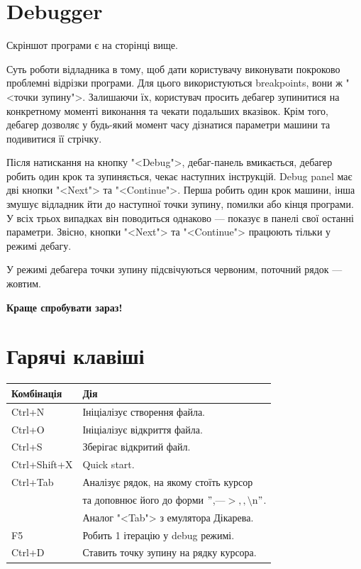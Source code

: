 \documentclass[oneside,final,14pt]{extreport}
\begin{document}
\pagebreak
{}
\setcounter{page}{14}
\section{Debugger}
Скріншот програми є на сторінці вище.
\medskip

Суть роботи відладника в тому, щоб дати користувачу виконувати покроково проблемні відрізки програми. Для цього використуються breakpoints, вони ж "<точки зупину">. Залишаючи їх, користувач просить дебагер зупинитися на конкретному моменті виконання та чекати подальших вказівок. Крім того, дебагер дозволяє у будь-який момент часу дізнатися параметри машини та подивитися її стрічку.

Після натискання на кнопку "<Debug">, дебаг-панель вмикається, дебагер робить один крок та зупиняється, чекає наступних інструкцій. Debug panel має дві кнопки "<Next"> та "<Continue">. Перша робить один крок машини, інша змушує відладник йти до наступної точки зупину, помилки або кінця програми. У всіх трьох випадках він поводиться однаково --- показує в панелі свої останні параметри.
Звісно, кнопки "<Next"> та "<Continue"> працюють тільки у режимі дебагу.

У режимі дебагера точки зупину підсвічуються червоним, поточний рядок --- жовтим.

{\bf Краще спробувати зараз!}

\section{Гарячі клавіші}
\label{sec:hotkeys}
\begin{tabular}{| l | l |}
	\hline
	Комбінація & Дія \\
	\hline
	Ctrl+N & Ініціалізує створення файла. \\
	\hline
	Ctrl+O & Ініціалізує відкриття файла. \\
	\hline
	Ctrl+S & Зберігає відкритий файл. \\
	\hline
	Ctrl+Shift+X & Quick start. \\
	\hline
	Ctrl+Tab & Аналізує рядок, на якому стоїть курсор \\
	 		 &  та доповнює його до форми $"$,---$>,,\setminus$n$"$.\\
			 & Аналог "<Tab"> з емулятора Дікарева.\\
	\hline
	F5 & Робить 1 ітерацію у debug режимі.\\
	\hline
	Ctrl+D & Ставить точку зупину на рядку курсора.\\
	\hline 
\end{tabular}
\bigskip
\end{document}
